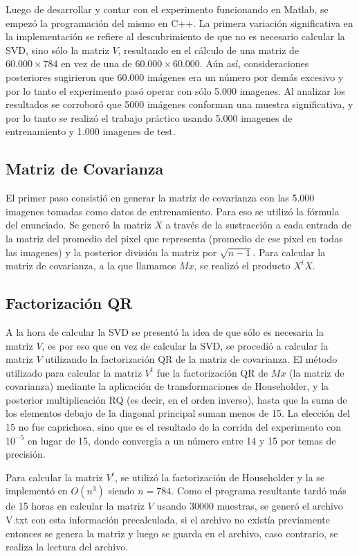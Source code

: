Luego de desarrollar y contar con el experimento funcionando en Matlab, se empez\'o la programaci\'on
del mismo en C++. La primera variaci\'on significativa en la implementaci\'on se refiere al
descubrimiento de que no es necesario calcular la SVD, sino s\'olo la matriz $V$, resultando
en el c\'alculo de una matriz de $60.000 \times 784$ en vez de una de $60.000 \times 60.000$.
A\'un as\'i, consideraciones posteriores sugirieron que 60.000 im\'agenes era un n\'umero por
dem\'as excesivo y por lo tanto el experimento pas\'o operar con s\'olo 5.000 imagenes.
Al analizar los resultados se corrobor\'o que 5000 im\'agenes conforman una muestra significativa,
y por lo tanto se realiz\'o el trabajo pr\'actico usando 5.000 imagenes de entrenamiento y 1.000 imagenes de test.

\subsection{Matriz de Covarianza}
El primer paso consisti\'o en generar la matriz de covarianza con las 5.000 imagenes tomadas como datos
de entrenamiento. Para eso se utiliz\'o la f\'ormula del enunciado. Se gener\'o la matriz $X$ a trav\'es
de la sustracci\'on a cada entrada de la matriz del promedio del pixel que representa (promedio de ese
pixel en todas las imagenes) y la posterior divisi\'on la matriz por $\sqrt{n-1}$. Para calcular la
matriz de covarianza, a la que llamamos $Mx$, se realiz\'o el producto $X^tX$. 

\subsection{Factorizaci\'on QR}
A la hora de calcular la SVD se present\'o la idea de que s\'olo es necesaria la matriz $V$, es por
eso que en vez de calcular la SVD, se procedi\'o a calcular la matriz $V$ utilizando la factorizaci\'on
QR de la matriz de covarianza. El m\'etodo utilizado para calcular la matriz $V^t$ fue la factorizaci\'on
QR de $Mx$ (la matriz de covarianza) mediante la aplicaci\'on de transformaciones de Householder, y la
posterior multiplicaci\'on RQ (es decir, en el orden inverso), hasta que la suma de los elementos debajo
de la diagonal principal suman menos de 15. La elecci\'on del 15 no fue caprichosa, sino que es el
resultado de la corrida del experimento con $10^{-5}$ en lugar de 15, donde converg\'ia a un n\'umero
entre 14 y 15 por temas de precisi\'on.

Para calcular la matriz $V^t$, se utiliz\'o la factorizaci\'on de Householder y la se implement\'o en $O(n^3)$
siendo $n = 784$. Como el programa resultante tard\'o m\'as de 15 horas en calcular la matriz $V$ usando 30000 muestras,
se gener\'o el archivo V.txt con esta informaci\'on precalculada, si el archivo no exist\'ia previamente
entonces se genera la matriz y luego se guarda en el archivo, caso contrario, se realiza la lectura del archivo.

